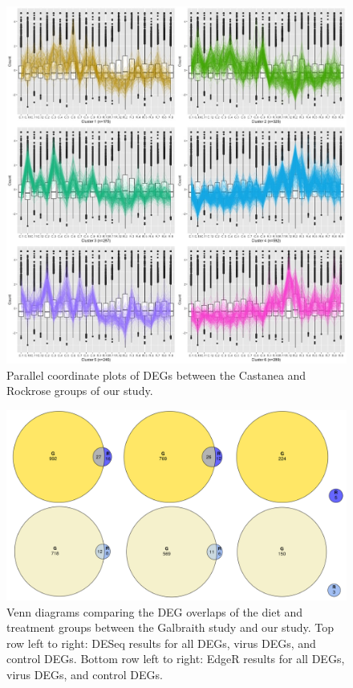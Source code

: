 \documentclass[11pt,a4paper,oldfontcommands,openany]{memoir}
\numberwithin{equation}{section} %
\begin{document}
\begin{figure}[H]
  \includegraphics[width=\textwidth]{../C_R/DESeq2/ClusterStandard/Clustering_data_FDR_05/C_R_6.jpg}
  \caption{Parallel coordinate plots of DEGs between the Castanea and Rockrose groups of our study.}
  \label{fig:pcpRutterDiet}
\end{figure}

\begin{figure}[H]
  \includegraphics[width=\textwidth]{Images/GRVenn}
  \caption{Venn diagrams comparing the DEG overlaps of the diet and treatment groups between the Galbraith study and our study. Top row left to right: DESeq results for all DEGs, virus DEGs, and control DEGs. Bottom row left to right: EdgeR results for all DEGs, virus DEGs, and control DEGs.}
  \label{fig:GRVenn}
\end{figure}
\end{document}
